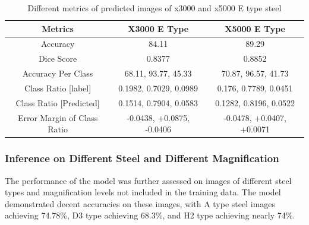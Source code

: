 \documentclass[]{article}
\begin{document}
\begin{table}[h!]
	\centering
	\begin{tabular}{|c|c|c|}
		\hline
		\textbf{Metrics} & \textbf{X3000 E Type} & \textbf{X5000 E Type}\\
		\hline
		Accuracy & 84.11 & 89.29 \\
		\hline
		Dice Score & 0.8377 & 0.8852 \\
		\hline
		Accuracy Per Class & 68.11, 93.77, 45.33 & 70.87, 96.57, 41.73 \\
		\hline
		Class Ratio [label] & 0.1982, 0.7029, 0.0989 & 0.176, 0.7789, 0.0451 \\
		\hline
		Class Ratio [Predicted] & 0.1514, 0.7904, 0.0583 & 0.1282, 0.8196, 0.0522 \\
		\hline
		Error Margin of Class Ratio & -0.0438, +0.0875, -0.0406 & -0.0478, +0.0407, +0.0071 \\
		\hline
	\end{tabular}
	\caption{Different metrics of predicted images of x3000 and x5000 E type steel}
\end{table}

\subsubsection{Inference on Different Steel and Different Magnification}

The performance of the model was further assessed on images of different steel types and magnification levels not included in the training data. The model demonstrated decent accuracies on these images, with A type steel images achieving 74.78\%, D3 type achieving 68.3\%, and H2 type achieving nearly 74\%. 
\end{document}
